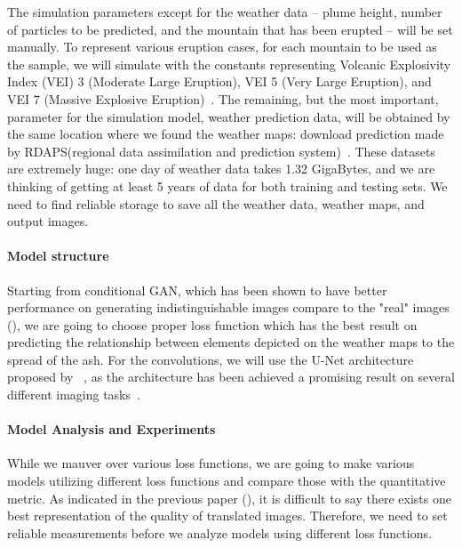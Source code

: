 \documentclass{article}
\begin{document}
\begin{doublespacing}
{  The simulation parameters except for the weather data – plume height, number of particles to be 
  predicted, and the mountain that has been erupted – will be set manually. To represent various 
  eruption cases, for each mountain to be used as the sample, we will simulate with the constants 
  representing Volcanic Explosivity Index (VEI) 3 (Moderate Large Eruption), VEI 5 (Very Large 
  Eruption), and VEI 7 (Massive Explosive Eruption)~\citep[p.1232]{Newhall1982}. The remaining, but
  the most important, parameter for the simulation model, weather prediction data, will be obtained 
  by the same location where we found the weather maps: download prediction made by RDAPS(regional 
  data assimilation and prediction system)~\citep[from][]{MDOP}. These datasets are extremely huge: 
  one day of weather data takes 1.32 GigaBytes, and we are thinking of getting at least 5 years of 
  data for both training and testing sets. We need to find reliable storage to save all the weather 
  data, weather maps, and output images.

  \paragraph{Model structure}
  Starting from conditional GAN, which has been shown to have better performance on generating 
  indistinguishable images compare to the "real" images (\citet{isola2016imagetoimage}), we are 
  going to choose proper loss function which has the best result on predicting the relationship 
  between elements depicted on the weather maps to the spread of the ash. For the convolutions, we 
  will use the U-Net architecture proposed by ~\citet{ronneberger2015unet}, as the architecture has 
  been achieved a promising result on several different imaging 
  tasks~\citep{isola2016imagetoimage, james2018simtoreal}.

  \paragraph{Model Analysis and Experiments}
  While we mauver over various loss functions, we are going to make various models utilizing 
  different loss functions and compare those with the quantitative metric. As indicated in the 
  previous paper (\citet{isola2016imagetoimage}), it is difficult to say there exists one best 
  representation of the quality of translated images. Therefore, we need to set reliable 
  measurements before we analyze models using different loss functions.

}
\end{doublespacing}
\end{document}
